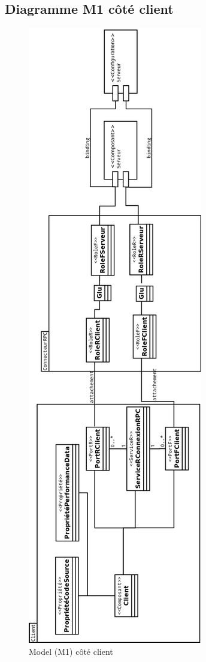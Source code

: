 \subsection{Diagramme M1 côté client}
\begin{figure}[htb]
  \centering
  \includegraphics[scale=0.24]{img/M11}
  \caption{Model (M1) côté client}
  \label{fig:M11}
\end{figure}

